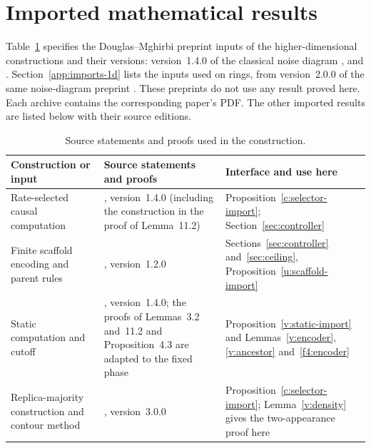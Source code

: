 \section{Imported mathematical results}\label{app:imports}
Table~\ref{tab:imports} specifies the Douglas--Mghirbi preprint inputs of the higher-dimensional constructions and their versions: version~1.4.0 of the classical noise diagram \cite{DMNoise2026}, \cite{DMPhase2026} and \cite{DMFixed2026}. Section~\ref{app:imports-1d} lists the inputs used on rings, from version~2.0.0 of the same noise-diagram preprint \cite{DMNoise1D2026}. These preprints do not use any result proved here. Each archive contains the corresponding paper's PDF. The other imported results are listed below with their source editions.

\begin{table}[!htbp]
\caption{Source statements and proofs used in the construction.}\label{tab:imports}
\centering\small
\begin{tabular}{@{}>{\raggedright\arraybackslash}p{.29\linewidth}>{\raggedright\arraybackslash}p{.39\linewidth}>{\raggedright\arraybackslash}p{.24\linewidth}@{}}
\toprule Construction or input & Source statements and proofs & Interface and use here\\\midrule
Rate-selected causal computation & \cite[Proposition~4.3; Lemmas~4.1--4.2, 6.1--6.3, 10.4, 11.2--11.4, 11.6, Section~11.4 and item~3 of the halting proof in Section~11.7]{DMNoise2026}, version~1.4.0 (including the construction in the proof of Lemma~11.2) & Proposition~\ref{c:selector-import}; Section~\ref{sec:controller}\\\addlinespace[3pt]
Finite scaffold encoding and parent rules & \cite[Definitions~3.1, 3.2 and~3.8, Lemma~3.9, and Lemmas~A.1--A.3]{DMPhase2026}, version~1.2.0 & Sections~\ref{sec:controller} and~\ref{sec:ceiling}, Proposition~\ref{u:scaffold-import}\\\addlinespace[3pt]
Static computation and cutoff & \cite[Lemmas~3.2--3.3, 4.1--4.2, 5.1, 10.3, 10.5 and~11.2, Proposition~4.3]{DMNoise2026}, version~1.4.0; the proofs of Lemmas~3.2 and~11.2 and Proposition~4.3 are adapted to the fixed phase & Proposition~\ref{v:static-import} and Lemmas~\ref{v:encoder}, \ref{v:ancestor} and~\ref{f4:encoder}\\\addlinespace[3pt]
Replica-majority construction and contour method & \cite[Theorem~2.1; Lemmas~12.3--12.4]{DMFixed2026}, version~3.0.0 & Proposition~\ref{c:selector-import}; Lemma~\ref{v:density} gives the two-appearance proof here\\\bottomrule
\end{tabular}
\end{table}

